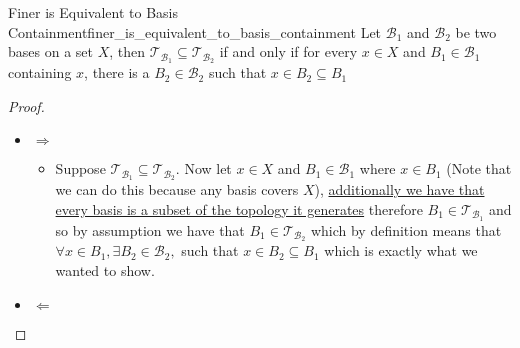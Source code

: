 \begin{proposition}
{Finer is Equivalent to Basis Containment}{finer_is_equivalent_to_basis_containment}
Let \(\mathcal{B}_{1}\) and \(\mathcal{B}_{2}\) be two bases on a set \(X\),
then \(\mathcal{T}_{\mathcal{B}_{1}} \subseteq \mathcal{T}_{\mathcal{B}_{2}}\)
if and only if for every \(x \in X\) and \(B_{1} \in \mathcal{B}_{1}\)
containing \(x\), there is a \(B_{2} \in \mathcal{B}_{2}\) such that \(x \in
B_{2} \subseteq B_{1}\)
\end{proposition}
\begin{proof}
\begin{itemize}
    \item \( \Rightarrow  \) 
    \begin{itemize}
        \item Suppose \( \mathcal{ T } _{ \mathcal{ B } _{ 1 }    } \subseteq
        \mathcal{ T } _{ \mathcal{ B } _{ 2 }   }    \). Now let \( x \in  X \)
        and \( B _{ 1 } \in  \mathcal{ B } _{ 1 }   \) where \( x \in B _{ 1 }  \)
        (Note that we can do this because any basis covers \( X \)),
        \hyperref[corollary:basis_is_a_subset_of_the_topology_it_generates]{additionally
        we have that every basis is a subset of the topology it generates}
        therefore \( B _{ 1 } \in \mathcal{ T } _{ \mathcal{ B } _{ 1 } }     \) and
        so by assumption we have that \( B _{ 1 } \in \mathcal{ T } _{ \mathcal{
        B} _{ 2 }   }   \) which by definition means that \( \forall x \in B _{
        1} , \exists B _{ 2 } \in  \mathcal{ B } _{ 2 }, \) such that \( x \in B
        _{ 2 } \subseteq B _{ 1 } \) which is exactly what we wanted to show.
    \end{itemize}
    \item \( \Leftarrow  \) 
\end{itemize}
\end{proof}

